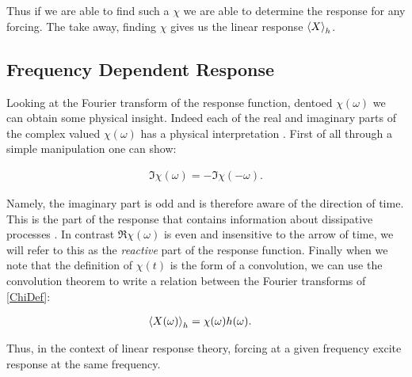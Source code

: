 \noindent Thus if we are able to find such a $\chi$ we are able to determine the response for any forcing. The take away, finding $\chi$ gives us the linear response $\expval{X}_h$.


\subsection{Frequency Dependent Response}

Looking at the Fourier transform of the response function, dentoed $\chi(\omega)$ we can obtain some physical insight. Indeed each of the real and imaginary parts of the complex valued $\chi(\omega)$ has a physical interpretation \cite{LiviPoliti2017}. First of all through a simple manipulation one can show:

\begin{align}
\Im{\chi(\omega)} = - \Im{\chi(-\omega)}. 
\end{align} 

\noindent Namely, the imaginary part is odd and is therefore aware of the direction of time. This is the part of the response that contains information about dissipative processes \cite{LiviPoliti2017}. In contrast $\Re{\chi(\omega)}$ is even and insensitive to the arrow of time, we will refer to this as the \textit{reactive} part of the response function. Finally when we note that the definition of $\chi(t)$ is the form of a convolution, we can use the convolution theorem to write a relation between the Fourier transforms of \ref{ChiDef}:

\begin{align}
\expval{X(\omega)}_h &= \chi(\omega) h(\omega).
\end{align}

\noindent Thus, in the context of linear response theory, forcing at a given frequency excite response at the same frequency.
